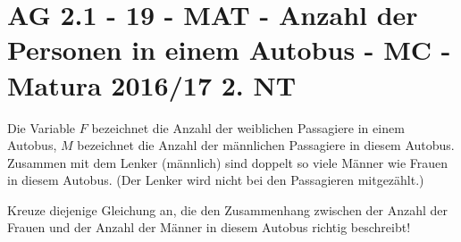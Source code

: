 \section{AG 2.1 - 19 - MAT - Anzahl der Personen in einem Autobus - MC - Matura 2016/17 2. NT}

\begin{beispiel}[AG 2.1]{1} %
Die Variable $F$ bezeichnet die Anzahl der weiblichen Passagiere in einem Autobus, $M$ bezeichnet die Anzahl der männlichen Passagiere in diesem Autobus. Zusammen mit dem Lenker (männlich) sind doppelt so viele Männer wie Frauen in diesem Autobus. (Der Lenker wird nicht bei den Passagieren mitgezählt.)

Kreuze diejenige Gleichung an, die den Zusammenhang zwischen der Anzahl der Frauen und der Anzahl der Männer in diesem Autobus richtig beschreibt!\leer

\end{beispiel}